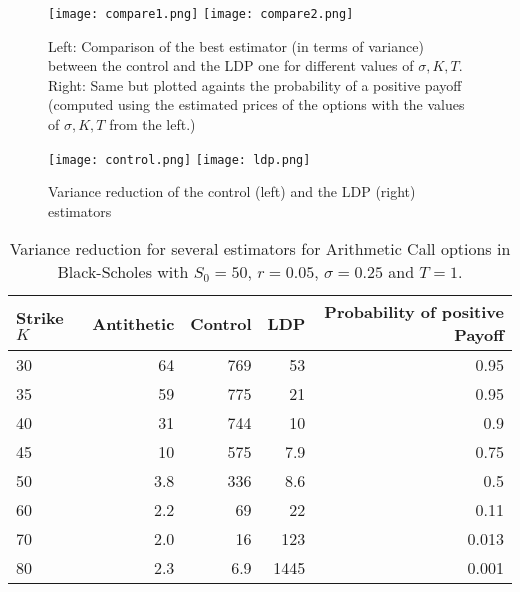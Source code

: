 \documentclass{amsart}[11pt]
\numberwithin{equation}{section}
\numberwithin{theorem}{subsection}
\numberwithin{proposition}{subsection}
\numberwithin{definition}{subsection}
\numberwithin{lemma}{subsection}
\numberwithin{assumption}{subsection}
\begin{document}
{\begin{figure}
    \centering
    \texttt{[image: compare1.png]}
    \texttt{[image: compare2.png]}
    \caption{\small{Left: Comparison of the best estimator (in terms of variance) between the control and the LDP one for different values of $\sigma, K, T$.
    Right: Same but plotted againts the probability of a positive payoff (computed using the estimated prices of the options with the values of $\sigma, K, T$ from the left.)
    }}
    \label{fig:BSCompare}
\end{figure}
\begin{figure}
    \centering
    \texttt{[image: control.png]}
    \texttt{[image: ldp.png]}
    \caption{\small{Variance reduction of the control (left) and 
     the LDP (right) estimators}
     }
    \label{fig:BSLDP}
\end{figure}

\begin{table}
\centering
\begin{tabular}{lrrrr}
\toprule
 Strike $K$ &  Antithetic &  Control &  LDP &  Probability of positive Payoff \\
\midrule
     30 &          64 &      769 &   53 &                            0.95 \\
     35 &          59 &      775 &   21 &                            0.95 \\
     40 &          31 &      744 &   10 &                             0.9 \\
     45 &          10 &      575 &  7.9 &                            0.75 \\
     50 &         3.8 &      336 &  8.6 &                             0.5 \\
     60 &         2.2 &       69 &   22 &                            0.11 \\
     70 &         2.0 &       16 &  123 &                           0.013 \\
     80 &         2.3 &      6.9 & 1445 &                          0.001 \\
\bottomrule
\end{tabular}
\caption{\small{Variance reduction for several estimators for Arithmetic Call options in Black-Scholes with $S_0=50$, $r=0.05$, $\sigma = 0.25$ and $T=1$.}}
\label{table:BSCompare}
\end{table}

}
\end{document}
